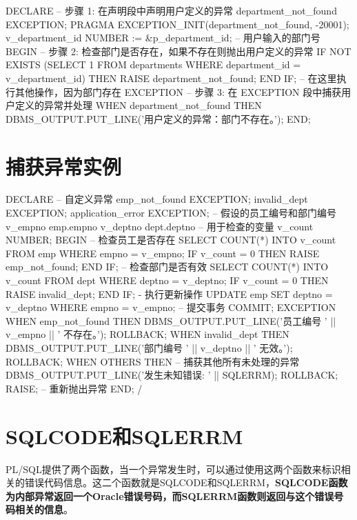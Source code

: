 \documentclass[11pt, a4paper, oneside, UTF8]{ctexbook}
\let\kaishu\relax %
\begin{document}
\begin{plsql}[caption=处理用户定义的错误示例2]
DECLARE
  -- 步骤 1: 在声明段中声明用户定义的异常
  department_not_found EXCEPTION;
  PRAGMA EXCEPTION_INIT(department_not_found, -20001);
  v_department_id NUMBER := &p_department_id; -- 用户输入的部门号
BEGIN
  -- 步骤 2: 检查部门是否存在，如果不存在则抛出用户定义的异常
  IF NOT EXISTS (SELECT 1 FROM departments WHERE department_id = v_department_id) THEN
    RAISE department_not_found;
  END IF;
  -- 在这里执行其他操作，因为部门存在
EXCEPTION
  -- 步骤 3: 在 EXCEPTION 段中捕获用户定义的异常并处理
  WHEN department_not_found THEN
    DBMS_OUTPUT.PUT_LINE('用户定义的异常：部门不存在。');
END;
\end{plsql}

\section{捕获异常实例}
\begin{plsql}[caption=一个捕获异常的实例]
DECLARE
  -- 自定义异常
  emp_not_found EXCEPTION;
  invalid_dept EXCEPTION;
  application_error EXCEPTION;
  -- 假设的员工编号和部门编号
  v_empno emp.empno%
  v_deptno dept.deptno%
  -- 用于检查的变量
  v_count NUMBER;
BEGIN
  -- 检查员工是否存在
  SELECT COUNT(*)
  INTO v_count
  FROM emp
  WHERE empno = v_empno;
  IF v_count = 0 THEN
    RAISE emp_not_found;
  END IF;
  -- 检查部门是否有效
  SELECT COUNT(*)
  INTO v_count
  FROM dept
  WHERE deptno = v_deptno;
  IF v_count = 0 THEN
    RAISE invalid_dept;
  END IF;
  - 执行更新操作
  UPDATE emp
  SET deptno = v_deptno
  WHERE empno = v_empno;
  -- 提交事务
  COMMIT;
EXCEPTION
  WHEN emp_not_found THEN
    DBMS_OUTPUT.PUT_LINE('员工编号 ' || v_empno || ' 不存在。');
    ROLLBACK;
  WHEN invalid_dept THEN
    DBMS_OUTPUT.PUT_LINE('部门编号 ' || v_deptno || ' 无效。');
    ROLLBACK;
  WHEN OTHERS THEN  -- 捕获其他所有未处理的异常
    DBMS_OUTPUT.PUT_LINE('发生未知错误: ' || SQLERRM);
    ROLLBACK;
    RAISE; -- 重新抛出异常
END;
/
\end{plsql}

\section{SQLCODE和SQLERRM}
PL/SQL提供了两个函数，当一个异常发生时，可以通过使用这两个函数来标识相关的错误代码信息。这二个函数就是SQLCODE和SQLERRM，{\bfseries\kaishu SQLCODE函数为内部异常返回一个Oracle错误号码，而SQLERRM函数则返回与这个错误号码相关的信息}。
\end{document}

